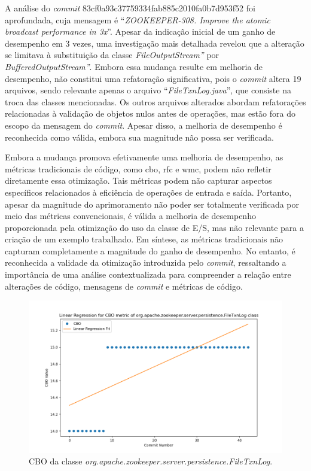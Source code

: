 A análise do \textit{commit} 83cf0a93c37759334fab885c2010fa0b7d953f52 foi aprofundada, cuja mensagem é ``\textit{ZOOKEEPER-308. Improve the atomic broadcast performance in 3x}''. Apesar da indicação inicial de um ganho de desempenho em 3 vezes, uma investigação mais detalhada revelou que a alteração se limitava à substituição da classe \textit{FileOutputStream''} por \textit{BufferedOutputStream''}. Embora essa mudança resulte em melhoria de desempenho, não constitui uma refatoração significativa, pois o \textit{commit} altera 19 arquivos, sendo relevante apenas o arquivo ``\textit{FileTxnLog.java}'', que consiste na troca das classes mencionadas. Os outros arquivos alterados abordam refatorações relacionadas à validação de objetos nulos antes de operações, mas estão fora do escopo da mensagem do \textit{commit}. Apesar disso, a melhoria de desempenho é reconhecida como válida, embora sua magnitude não possa ser verificada.

Embora a mudança promova efetivamente uma melhoria de desempenho, as métricas tradicionais de código, como \gls{cbo}, \gls{rfc} e \gls{wmc}, podem não refletir diretamente essa otimização. Tais métricas podem não capturar aspectos específicos relacionados à eficiência de operações de entrada e saída. Portanto, apesar da magnitude do aprimoramento não poder ser totalmente verificada por meio das métricas convencionais, é válida a melhoria de desempenho proporcionada pela otimização do uso da classe de E/S, mas não relevante para a criação de um exemplo trabalhado. Em síntese, as métricas tradicionais não capturam completamente a magnitude do ganho de desempenho. No entanto, é reconhecida a validade da otimização introduzida pelo \textit{commit}, ressaltando a importância de uma análise contextualizada para compreender a relação entre alterações de código, mensagens de \textit{commit} e métricas de código.

\begin{figure}[h]
    \centering
    \includegraphics[width=0.8\linewidth]{figuras/343-83cf0a93c37759334fab885c2010fa0b7d953f52/Class-org.apache.zookeeper.server.persistence.FileTxnLog/CBO.png}
    \caption{CBO da classe \textit{org.apache.zookeeper.server.persistence.FileTxnLog}.}
    \label{fig:CBO3xPerformanceClass}
\end{figure}

